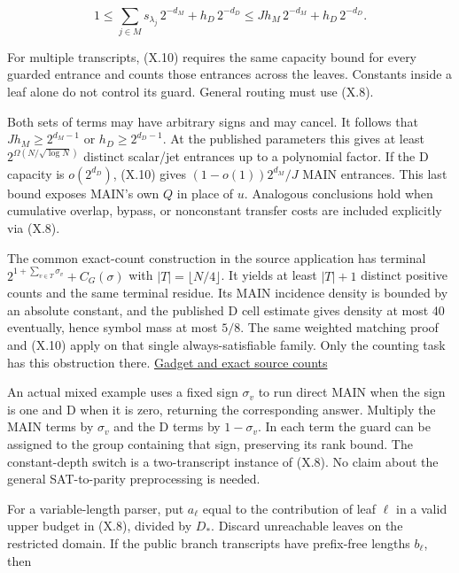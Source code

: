 \documentclass[
  11pt,
]{article}
\begin{document}
\[
        1\le \sum_{j\in M}s_{\lambda_j}\,2^{-d_M}
                        +h_D\,2^{-d_D}
          \le J h_M\,2^{-d_M}+h_D\,2^{-d_D}.               \tag{X.10}
\]

For multiple transcripts, (X.10) requires the same capacity bound for
every guarded entrance and counts those entrances across the leaves.
Constants inside a leaf alone do not control its guard. General routing
must use (X.8).

Both sets of terms may have arbitrary signs and may cancel. It follows
that \(J h_M\ge2^{d_M-1}\) or \(h_D\ge2^{d_D-1}\). At the published
parameters this gives at least \(2^{\Omega(N/\sqrt{\log N})}\) distinct
scalar/jet entrances up to a polynomial factor. If the D capacity is
\(o(2^{d_D})\), (X.10) gives \((1-o(1))2^{d_M}/J\) MAIN entrances. This
last bound exposes MAIN's own \(Q\) in place of \(u\). Analogous
conclusions hold when cumulative overlap, bypass, or nonconstant
transfer costs are included explicitly via (X.8).

The common exact-count construction in the source application has
terminal \(2^{1+\sum_{v\in T}\sigma_v}+C_G(\sigma)\) with
\(|T|=\lfloor N/4\rfloor\). It yields at least \(|T|+1\) distinct
positive counts and the same terminal residue. Its MAIN incidence
density is bounded by an absolute constant, and the published D cell
estimate gives density at most 40 eventually, hence symbol mass at most
\(5/8\). The same weighted matching proof and (X.10) apply on that
single always-satisfiable family. Only the counting task has this
obstruction there. \href{https://github.com/dch-and-Elara/some-research-inspired-by-openais-eth-preprint/tree/main/rank-budget-barriers}{Gadget and
exact source counts}

An actual mixed example uses a fixed sign \(\sigma_v\) to run direct
MAIN when the sign is one and D when it is zero, returning the
corresponding answer. Multiply the MAIN terms by \(\sigma_v\) and the D
terms by \(1-\sigma_v\). In each term the guard can be assigned to the
group containing that sign, preserving its rank bound. The
constant-depth switch is a two-transcript instance of (X.8). No claim
about the general SAT-to-parity preprocessing is needed.

For a variable-length parser, put \(a_\ell\) equal to the contribution
of leaf \(\ell\) in a valid upper budget in (X.8), divided by \(D_*\).
Discard unreachable leaves on the restricted domain. If the public
branch transcripts have prefix-free lengths \(b_\ell\), then
\end{document}
